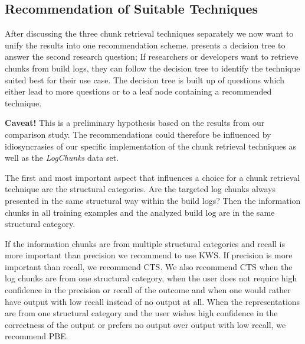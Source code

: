\subsection{Recommendation of Suitable Techniques}
After discussing the three chunk retrieval techniques separately we
now want to unify the results into one recommendation scheme.
 presents a decision tree
to answer the second research question;
If researchers or developers want to retrieve chunks from build logs,
they can follow the decision tree to identify the technique
suited best for their use case.
The decision tree is built up of questions
which either lead to more questions or to a leaf node containing a
recommended technique.

\textbf{Caveat!}
This is a preliminary hypothesis based on the results
from our comparison study.
The recommendations could therefore be
influenced by idiosyncrasies of our specific implementation of the
chunk retrieval techniques as well as the \emph{LogChunks}
data set.

The first and most important aspect that influences a choice for
a chunk retrieval technique are the structural categories.
Are the targeted log chunks always presented in
the same structural way within the build logs? Then the information
chunks in all training examples and the analyzed build log are in the
same structural category.

If the information chunks are from multiple structural categories
and recall is more important than precision we recommend
to use KWS\@.
If precision is more important than recall, we
recommend CTS\@.
We also recommend CTS when the log chunks are
from one structural category, when the user does not require high
confidence in the precision or recall of the outcome and when one
would rather have output with low recall instead of no output at all.
When the representations are from one structural category and the user
wishes high confidence in the correctness of the output or prefers
no output over output with low recall, we recommend PBE\@.

